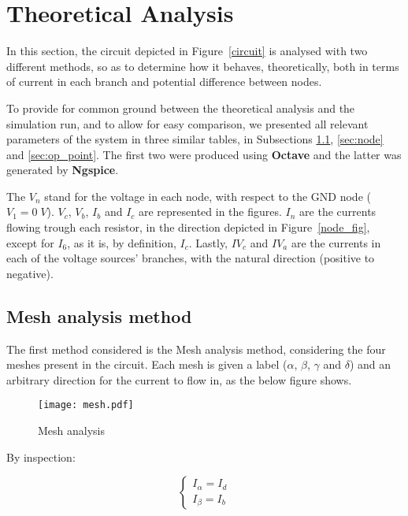\section{Theoretical Analysis}
\label{sec:analysis}

In this section, the circuit depicted in Figure~\ref{circuit} is analysed with two different methods, so as to determine how it behaves, theoretically, both in terms of current in each branch and potential difference between nodes.

To provide for common ground between the theoretical analysis and the simulation run, and to allow for easy comparison, we presented all relevant parameters of the system in three similar tables, in Subsections \ref{sec:mesh}, \ref{sec:node} and \ref{sec:op_point}. The first two were produced using {\bf Octave} and the latter was generated by {\bf Ngspice}.

The $V_n$ stand for the voltage in each node, with respect to the GND node ($V_1=0\;V$). $V_c$, $V_b$, $I_b$ and $I_c$ are represented in the figures. $I_n$ are the currents flowing trough each resistor, in the direction depicted in Figure~\ref{node_fig}, except for $I_6$, as it is, by definition, $I_c$. Lastly, $IV_c$ and $IV_a$ are the currents in each of the voltage sources' branches, with the natural direction (positive to negative).

\subsection{Mesh analysis method}
\label{sec:mesh}

The first method considered is the Mesh analysis method, considering the four meshes present in the circuit. Each mesh is given a label ($\alpha$, $\beta$, $\gamma$ and $\delta$) and an arbitrary direction for the current to flow in, as the below figure shows.

\begin{figure}[H]
  \centering
  \texttt{[image: mesh.pdf]}
  \caption{Mesh analysis}
  \label{mesh_fig}
\end{figure}

\newpage

By inspection:

\begin{equation}
  \begin{cases}
    I_{\alpha} = I_d \\
    I_{\beta} = I_b
  \end{cases}
\end{equation}

